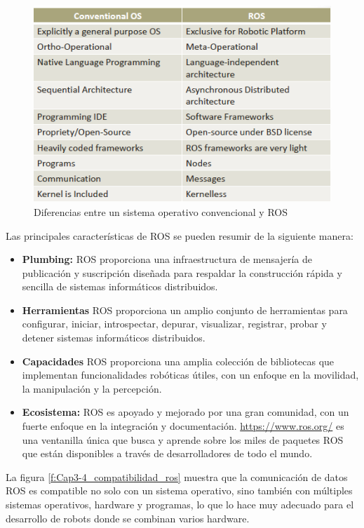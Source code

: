         \begin{figure}[htb]
            \centering
            \includegraphics[width=0.65\linewidth]{Main/Chapter3/Images3/3-4/diferencia-ROS-SO.png}
            \caption{Diferencias entre un sistema operativo convencional y ROS}
            \label{f:Cap3-4_diferencias_ros_so}
        \end{figure}
        
        \newpage
        
        Las principales características de ROS se pueden resumir de la siguiente manera:
        
        \begin{itemize}
            \item \textbf{Plumbing:} ROS proporciona una infraestructura de mensajería de publicación y suscripción diseñada para respaldar la construcción rápida y sencilla de sistemas informáticos distribuidos.
            \item \textbf{Herramientas} ROS proporciona un amplio conjunto de herramientas para configurar, iniciar, introspectar, depurar, visualizar, registrar, probar y detener sistemas informáticos distribuidos.
            \item \textbf{Capacidades} ROS proporciona una amplia colección de bibliotecas que implementan funcionalidades robóticas útiles, con un enfoque en la movilidad, la manipulación y la percepción.
            \item \textbf{Ecosistema:} ROS es apoyado y mejorado por una gran comunidad, con un fuerte enfoque en la integración y documentación. \url{https://www.ros.org/} es una ventanilla única que busca y aprende sobre los miles de paquetes ROS que están disponibles a través de desarrolladores de todo el mundo.
        \end{itemize}

        La figura \eqref{f:Cap3-4_compatibilidad_ros} muestra que la comunicación de datos ROS es compatible no solo con un sistema operativo, sino también con múltiples sistemas operativos, hardware y programas, lo que lo hace muy adecuado para el desarrollo de robots donde se combinan varios hardware. 
        
